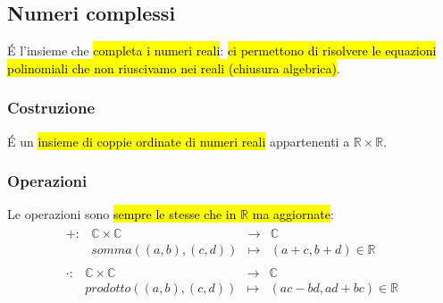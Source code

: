 \subsection{Numeri complessi}
\'E l'insieme che \hl{completa i numeri reali}: \hl{ci permettono di risolvere le
equazioni polinomiali che non riuscivamo nei reali (chiusura algebrica)}. 

\subsubsection{Costruzione}
\'E un \hl{insieme di coppie ordinate di numeri reali} appartenenti a 
$\mathbb{R} \times \mathbb{R}$.

\subsubsection{Operazioni}
Le operazioni sono \hl{sempre le stesse che in $\mathbb{R}$ ma aggiornate}:
\begin{align*}
    \begin{array}{cccc}
        +: &\mathbb{C} \times \mathbb{C} &\to &\mathbb{C} \\
        &somma((a,b), (c,d)) &\mapsto & (a+c, b+d) \in \mathbb{R}
    \end{array} \\
    \begin{array}{cccc}
        \cdot: &\mathbb{C} \times \mathbb{C} &\to &\mathbb{C} \\
        &prodotto((a,b), (c,d)) &\mapsto & (ac-bd, ad + bc) \in \mathbb{R}
    \end{array}
\end{align*} 
